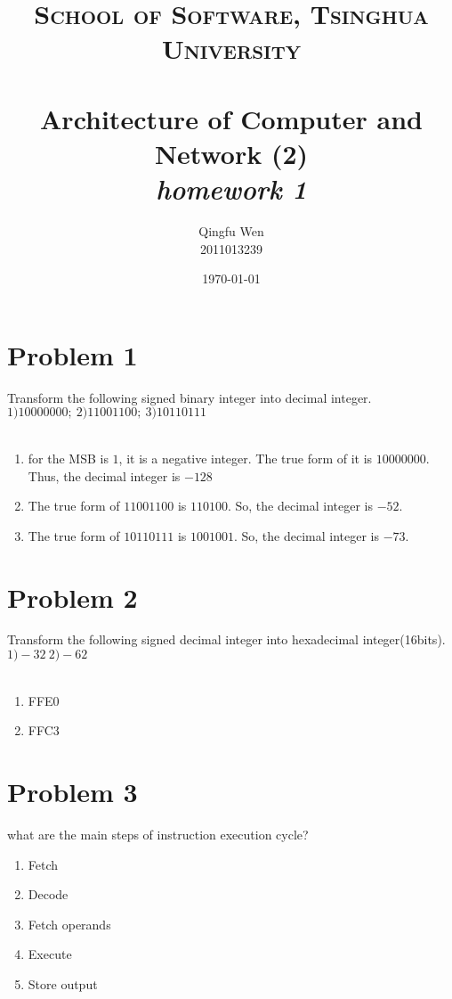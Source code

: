 \documentclass[paper=a4, fontsize=11pt]{scrartcl} %
\title{	
\normalfont \normalsize
\textsc{School of Software, Tsinghua University} \\ [25pt] %
\horrule{0.5pt} \\[0.4cm] %
\huge Architecture of Computer and Network (2)\\ %
\LARGE\textit{homework 1}
\horrule{2pt} \\[0.5cm] %
}
\author{Qingfu Wen \\ \normalsize 2011013239} %
\date{\normalsize\today} %
\numberwithin{equation}{section} %
\numberwithin{figure}{section} %
\numberwithin{table}{section} %
\begin{document}
\maketitle %
\tableofcontents
\newpage

\section{Problem 1}
Transform the following signed binary integer into decimal integer. \\
    $1) 10000000; \ 2) 11001100;  \ 3) 10110111 $ \\
\\
\begin{enumerate}
\item
for the MSB is $1$, it is a negative integer. The true form of it is $10000000$.
Thus, the decimal integer is $-128$ \\
\item
The true form of $11001100$ is $110100$. So, the decimal integer is $-52$.  \\
\item
The true form of $10110111$ is $1001001$. So, the decimal integer is $-73$.
\end{enumerate}

\section{Problem 2}
Transform the following signed decimal integer into hexadecimal integer(16bits). \\
$1) -32 \  2) -62$ \\
\\
\begin{enumerate}
\item
FFE0\\
\item
FFC3\\
\end{enumerate}

\section{Problem 3}
what are the main steps of instruction execution cycle? \\
\begin{enumerate}
\item Fetch
\item Decode
\item Fetch operands
\item Execute
\item Store output
\end{enumerate}
\end{document}
